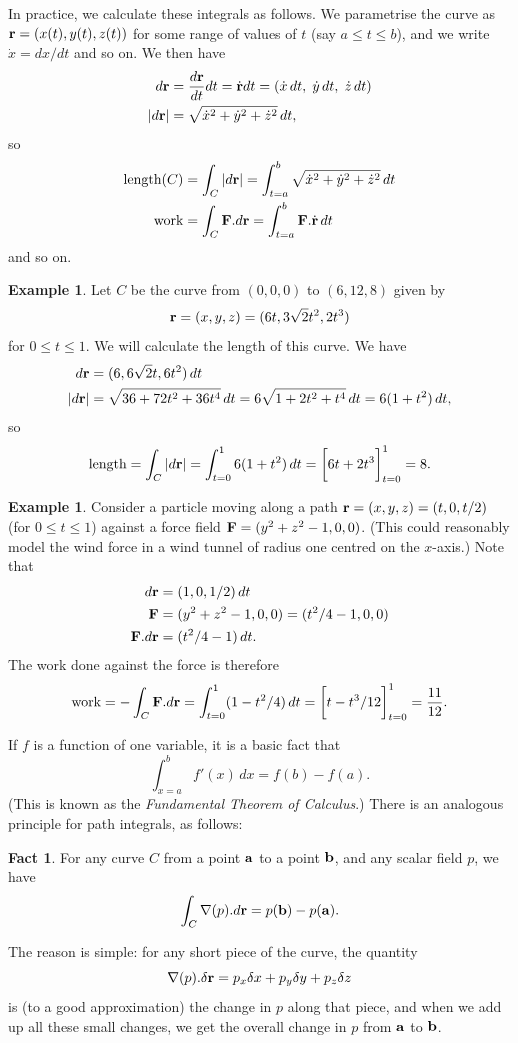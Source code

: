 \documentclass[reqno]{amsart}
\theoremstyle{definition}
\newtheorem{example}[theorem]{Example}
\newtheorem{fact}[theorem]{Fact}
\begin{document}
In practice, we calculate these integrals as follows.  We parametrise
the curve as $\mathbf{r}=(x(t),y(t),z(t))$ for some range of values of $t$
(say $a\leq t\leq b$), and we write $\dot{x}=dx/dt$ and so on.  We
then have
\begin{align*}
 d\mathbf{r} &= \frac{d\mathbf{r}}{dt}dt = \dot{\mathbf{r}} dt = 
          (\dot{x}\,dt,\;\dot{y}\,dt,\;\dot{z}\,dt) \\
 |d\mathbf{r}| &= \sqrt{\dot{x}^2+\dot{y}^2+\dot{z}^2}\,dt,
\end{align*}
so
\begin{align*}
 \text{length}(C) 
  &= \int_C|d\mathbf{r}| =
    \int_{t=a}^b \sqrt{\dot{x}^2+\dot{y}^2+\dot{z}^2}\,dt \\
 \text{work}
  &= \int_C \mathbf{F}.d\mathbf{r} = \int_{t=a}^b \mathbf{F}.\dot{\mathbf{r}}\,dt
\end{align*}
and so on.

\begin{example}\label{eg-curve-length}
 Let $C$ be the curve from $(0,0,0)$ to $(6,12,8)$ given by 
 \[ \mathbf{r} = (x,y,z) = (6t,3\sqrt{2}t^2,2t^3) \]
 for $0\leq t\leq 1$.  We will calculate the length of this curve.  We
 have 
 \begin{align*}
  d\mathbf{r} &= (6,6\sqrt{2}t,6t^2)\, dt \\
  |d\mathbf{r}| &= \sqrt{36+72t^2+36t^4} \,dt = 
    6\sqrt{1+2t^2+t^4}\,dt = 6(1+t^2)\,dt,
 \end{align*}
 so
 \[ \text{length} = \int_C|d\vr| = \int_{t=0}^1 6(1+t^2)\,dt =
     \CH{6t+2t^3}_{t=0}^1 = 8.
 \]
\end{example}
\begin{example}
 Consider a particle moving along a path $\mathbf{r}=(x,y,z)=(t,0,t/2)$ (for
 $0\leq t\leq 1$) against a force field $\mathbf{F}=(y^2+z^2-1,0,0)$.  (This
 could reasonably model the wind force in a wind tunnel of radius one
 centred on the $x$-axis.)  Note that
 \begin{align*}
  d\mathbf{r} &= (1,0,1/2)\,dt \\
  \mathbf{F} &= (y^2+z^2-1,0,0) = (t^2/4-1,0,0) \\
  \mathbf{F} . d\mathbf{r} &= (t^2/4-1)\,dt.
 \end{align*}
 The work done against the force is therefore
 \[ \text{work} = -\int_C\vF.d\vr =
     \int_{t=0}^1 (1-t^2/4)\,dt = \CH{t-t^3/12}_{t=0}^1 = \frac{11}{12}.
 \]
\end{example}

If $f$ is a function of one variable, it is a basic fact that
\[ \int_{x=a}^b f'(x)\,dx = f(b) - f(a). \]
(This is known as the \emph{Fundamental Theorem of Calculus}.)  There
is an analogous principle for path integrals, as follows:
\begin{fact}
 For any curve $C$ from a point $\mathbf{a}$ to a point $\mathbf{b}$, and any
 scalar field $p$, we have 
 \[ \int_C \nabla(p).d\mathbf{r} = p(\mathbf{b}) - p(\mathbf{a}). \]
\end{fact}
The reason is simple: for any short piece of the curve, the quantity 
\[ \nabla(p).\delta\mathbf{r} = p_x\delta x+p_y\delta y+p_z\delta z \]
is (to a good approximation) the change in $p$ along that piece, and
when we add up all these small changes, we get the overall change in
$p$ from $\mathbf{a}$ to $\mathbf{b}$.  
\end{document}
